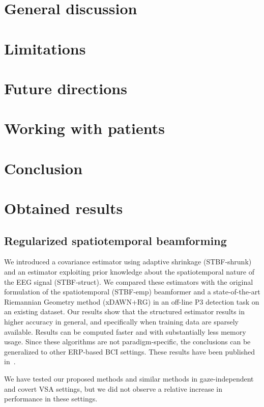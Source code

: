 \section{General discussion}
\section{Limitations}
\section{Future directions}
\section{Working with patients}
\section{Conclusion}

\section{Obtained results}

\subsection{Regularized spatiotemporal beamforming}
We introduced a covariance estimator using adaptive shrinkage (STBF-shrunk) and an estimator
exploiting prior knowledge about the spatiotemporal nature of the EEG signal
(STBF-struct).
We compared these estimators with the original formulation of the
spatiotemporal (STBF-emp)
beamformer and a state-of-the-art Riemannian Geometry method (xDAWN+RG) in an off-line P3 detection task on
an existing dataset.
Our results show that the structured estimator results in higher accuracy in
general, and specifically when training data are sparsely available.
Results can be computed faster and with
substantially less memory usage.
Since these algorithms are not paradigm-specific, the conclusions can be
generalized to other ERP-based BCI settings.
These results have been published in~\cite{VanDenKerchove2022}.

We have tested our proposed methods and similar methods in gaze-independent and
covert VSA settings, but we did not observe a relative increase in performance
in these settings.


